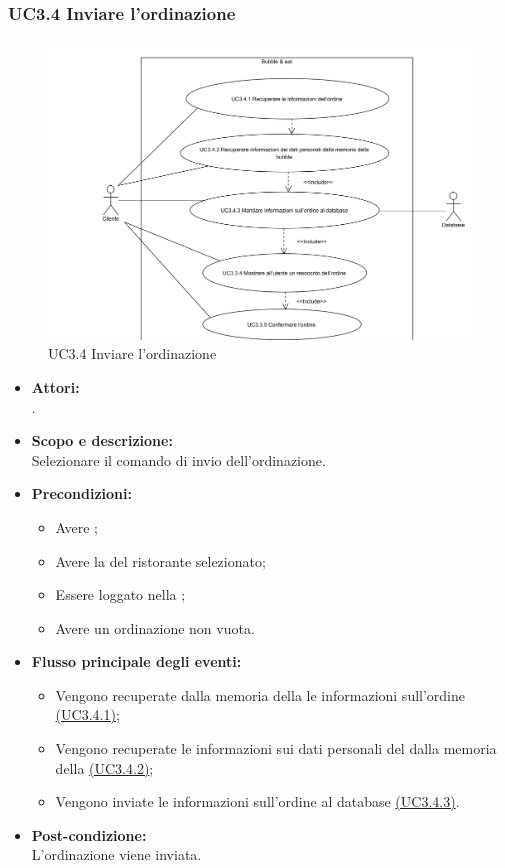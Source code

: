 \subsubsection{UC3.4 Inviare l'ordinazione} \label{UC3.4}

\begin{figure}[H]
	\centering
	\includegraphics[width=15cm]{../../documenti/AnalisiDeiRequisiti/Diagrammi_img/uc3_4.png}
	\caption{UC3.4 Inviare l'ordinazione}
\end{figure}

\begin{itemize}
	\item \textbf{Attori:}
	\\.
	\item \textbf{Scopo e descrizione:} 
	\\Selezionare il comando di invio dell'ordinazione.
	\item \textbf{Precondizioni:}
	\begin{itemize}
		\item Avere ;
		\item Avere la  del ristorante selezionato;
		\item Essere loggato nella ;
		\item Avere un ordinazione non vuota.
	\end{itemize}
	\item \textbf{Flusso principale degli eventi:}
	\begin{itemize}
		\item Vengono recuperate dalla memoria della  le informazioni sull'ordine \hyperref[UC3.4.1]{(UC3.4.1)};
		\item Vengono recuperate le informazioni sui dati personali del  dalla memoria della  \hyperref[UC3.4.2]{(UC3.4.2)};
		\item Vengono inviate le informazioni sull'ordine al database \hyperref[UC3.4.3]{(UC3.4.3)}.
	\end{itemize}
	\item \textbf{Post-condizione:}
	\\L'ordinazione viene inviata.
\end{itemize}


